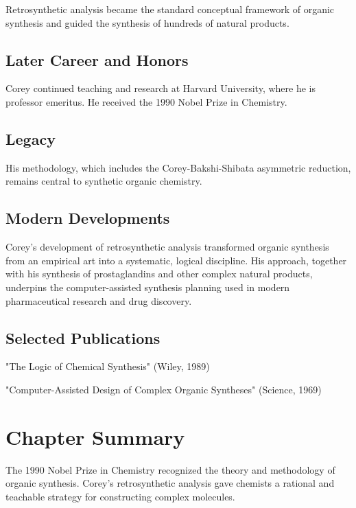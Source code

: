 Retrosynthetic analysis became the standard conceptual framework of organic synthesis and guided the synthesis of hundreds of natural products.

\subsection*{Later Career and Honors}

Corey continued teaching and research at Harvard University, where he is professor emeritus. He received the 1990 Nobel Prize in Chemistry.

\subsection*{Legacy}

His methodology, which includes the Corey-Bakshi-Shibata asymmetric reduction, remains central to synthetic organic chemistry.

\subsection*{Modern Developments}

Corey's development of retrosynthetic analysis transformed organic synthesis from an empirical art into a systematic, logical discipline. His approach, together with his synthesis of prostaglandins and other complex natural products, underpins the computer-assisted synthesis planning used in modern pharmaceutical research and drug discovery.

\subsection*{Selected Publications}

"The Logic of Chemical Synthesis" (Wiley, 1989)

"Computer-Assisted Design of Complex Organic Syntheses" (Science, 1969)

\clearpage

\section*{Chapter Summary}

The 1990 Nobel Prize in Chemistry recognized the theory and methodology of organic synthesis. Corey's retrosynthetic analysis gave chemists a rational and teachable strategy for constructing complex molecules.
